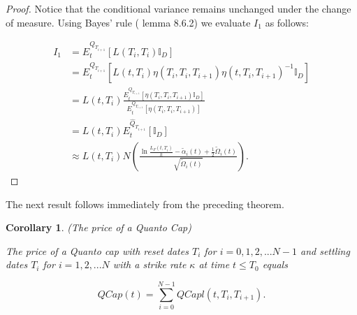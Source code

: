 \documentclass[11pt]{article}
\newtheorem{corollary}{Corollary}[section]
\newtheorem{lemma}[theorem]{Lemma}
\newcommand{\filt}{\ensuremath{\mathcal{F}}}
\begin{document}
\begin{proof}
Notice that the conditional variance remains unchanged under the change of measure. Using Bayes' rule (\cite{oks} lemma 8.6.2) we evaluate $I_1$ as follows:








\begin{equation*}
\begin{split}
    I_1&=E^{Q_{T_{i+1}}}_t[L(T_i,T_i)\mathbb{I}_D]\\
    &= E^{Q_{T_{i+1}}}_t[L(t,T_i)\eta(T_i,T_i,T_{i+1})\eta(t,T_i,T_{i+1})^{-1}\mathbb{I}_D]\\
    &=L(t,T_i)\frac{E^{Q_{T_{i+1}}}_t[\eta(T_i,T_i,T_{i+1})\mathbb{I}_D]}{E^{Q_{T_{i+1}}}_t[\eta(T_i,T_i,T_{i+1})]}\\
    &=L(t,T_i)E^{\hat{Q}_{T_{i+1}}}_t[\mathbb{I}_D]\\
    &\approx L(t,T_i)N\left(\frac{\ln\frac{L_F(t,T_i)}{k}-\tilde{\alpha}_i(t)+\frac{1}{2}\tilde{\Omega}_i(t)}{\sqrt{\tilde{\Omega}_i(t)}}\right).
\end{split}
\end{equation*}
\end{proof}
The next result follows immediately from the preceding theorem.
\begin{corollary} (The price of a Quanto Cap)

The price of a Quanto cap with reset dates $T_{i}$ for $i=0,1,2,...N-1$ and settling dates $T_i$ for $i=1,2,...N$ with a strike rate $\kappa$ at time $t\leq T_0$ equals

\begin{equation*}
    QCap(t)=\sum_{i=0}^{N-1}QCapl(t,T_i,T_{i+1}).
\end{equation*}

\end{corollary}
\end{document}
